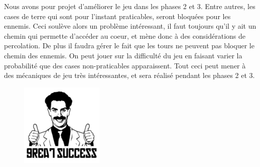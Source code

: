 \documentclass[a4paper,11pt]{article}
\begin{document}
    Nous avons pour projet d'améliorer le jeu dans les phases 2 et 3. Entre autres,
    les cases de terre qui sont pour l'instant praticables, seront bloquées pour les ennemis.
    Ceci soulève alors un problème intéressant, il faut toujours qu'il y ait un
    chemin qui permette d'accéder au coeur, et mène donc à des considérations de
    percolation. De plus il faudra gérer le fait que les tours ne peuvent pas bloquer
    le chemin des ennemis. On peut jouer sur la difficulté du jeu en faisant varier
    la probabilité que des cases non-praticables apparaissent.\newline
    Tout ceci peut mener à des mécaniques de jeu très intéressantes, et sera réalisé
    pendant les phases 2 et 3.
  \begin{figure}[h]
    \includegraphics{great_success.png} 
  \end{figure}
\end{document}
